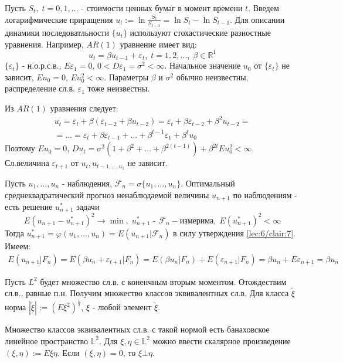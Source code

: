 \begin{example}
	Пусть $S_t, \; t = 0, 1, \dots$ - стоимости ценных бумаг в момент времени $t$. Введем логарифмические приращения 
	$\displaystyle u_t := \ln \frac{S_t}{S_{t-1}} = \ln S_t - \ln S_{t-1}$.
	Для описании динамики последоватльности $\{u_t\}$ используют стохастические разностные уравнения. Например, $AR(1)$ уравнение имеет вид:
	$$u_t = \beta u_{t-1} + \varepsilon_t, \; t = 1, 2, \dots, \; \beta \in \mathbb{R}^1$$
	$\{\varepsilon_t\}$ - н.о.р.с.в., $E \varepsilon_1 = 0$, $0 < D \varepsilon_1 = \sigma^2 < \infty$.
	Начальное значение $u_0$ от $\{\varepsilon_t\}$ не зависит, $E u_0 = 0$, $E u_0^2 < \infty$. Параметры $\beta$ и $\sigma^2$ обычно неизвестны, распределение сл.в. $\varepsilon_1$ тоже неизвестны.

	Из $AR(1)$ уравнения следует:
	\begin{gather*}
		u_t =\varepsilon_t + \beta(\varepsilon_{t-2} + \beta u_{t-2}) = \varepsilon_t + \beta\varepsilon_{t-2}+ \beta^2u_{t-2}=\\
		=...=\varepsilon_t+\beta\varepsilon_{t-1}+...+\beta^{t-1}\varepsilon_1 + \beta^tu_0
	\end{gather*}
	Поэтому $\displaystyle E u_0 = 0$, $\displaystyle D u_t = \sigma^2(1+\beta^2+...+\beta^{2(t-1)}) + \beta^{2t}Eu_0^2<\infty$.
	Сл.величина $\varepsilon_{t+1}$ от ${u_t, u_{t-1, \dots,u_1}}$ не зависит.

	Пусть $u_1, \dots, u_n$ - наблюдения, $\mathcal{F}_n = \sigma \{u_1, \dots, u_n\}$. Оптимальный среднеквадратический прогноз ненаблюдаемой величины $u_{n+1}$ по наблюдениям - есть решение $u_{n+1}^*$ задачи
	$$E(u_{n+1} - u_{n+1}^*)^2 \to \min, \; u_{n+1}^* \text{ - } \mathcal{F}_n-\text{измерима}, \; E(u_{n+1}^*)^2 < \infty$$
	Тогда $\displaystyle u_{n+1}^* = \varphi(u_1, \dots, u_n) = E(u_{n+1}|\mathcal{F}_n)$ в силу утверждения \ref{lec:6/clair:7}. Имеем:
	\begin{gather*}
		E(u_{n+1}|F_n) = E(\beta u_n + \varepsilon_{t+1}|F_n) = E(\beta u_n|F_n) + E(\varepsilon_{n+1}|F_n) = \beta u_n + E\varepsilon_{n+1} = \beta u_n
	\end{gather*}

	Пусть $L^2$ будет множество сл.в. с коненчным вторым моментом. Отождествим сл.в., равные п.н. Получим множество классов эквивалентных сл.в. Для класса $\tilde{\xi}$ норма $|\tilde{\xi}|:=\left(E \xi^2\right)^{\frac{1}{2}}$, $\xi$ - любой элемент $\tilde{\xi}$.

	Множество классов эквивалентных сл.в. с такой нормой есть банаховское линейное пространство $\mathbb{L}^2$. Для $\xi, \eta \in \mathbb{L}^2$ можно ввести скалярное произведение $(\xi, \eta) := E \xi \eta$.
	Если $(\xi, \eta) = 0$, то $\xi \bot \eta$.


\end{example}
